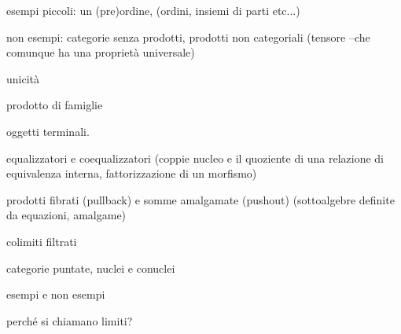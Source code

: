esempi piccoli: un (pre)ordine, (ordini, insiemi di parti etc...)

non esempi: categorie senza prodotti, prodotti non categoriali (tensore --che comunque ha una proprietà universale)

unicità

prodotto di famiglie

oggetti terminali.

equalizzatori e coequalizzatori (coppie nucleo e il quoziente di una relazione di equivalenza interna, fattorizzazione di un morfismo)

prodotti fibrati (pullback) e somme amalgamate (pushout) (sottoalgebre definite da equazioni, amalgame)

colimiti filtrati

categorie puntate, nuclei e conuclei

esempi e non esempi

perché si chiamano limiti?
\begin{remark}
\end{remark}
